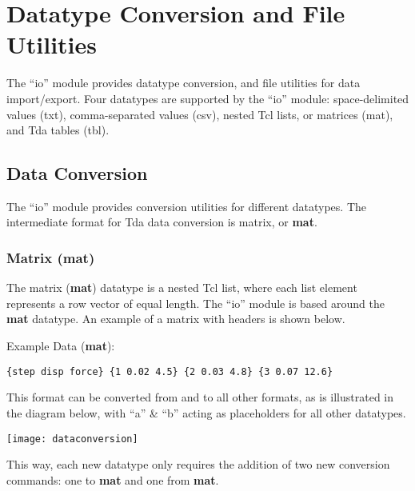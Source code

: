 \cleartooddpage[\thispagestyle{empty}]
\chapter{Datatype Conversion and File Utilities}\label{io}
The ``io'' module provides datatype conversion, and file utilities for data import/export.
Four datatypes are supported by the ``io'' module: space-delimited values (txt), comma-separated values (csv), nested Tcl lists, or matrices (mat), and Tda tables (tbl). 
\clearpage

\section{Data Conversion}
The ``io'' module provides conversion utilities for different datatypes.  The intermediate format for Tda data conversion is matrix, or \textbf{mat}. 
\subsection{Matrix (mat)}
The matrix (\textbf{mat}) datatype is a nested Tcl list, where each list element represents a row vector of equal length. The ``io'' module is based around the \textbf{mat} datatype. An example of a matrix with headers is shown below. 
\begin{example}{Example Data (\textbf{mat}):}
\begin{lstlisting}
{step disp force} {1 0.02 4.5} {2 0.03 4.8} {3 0.07 12.6}
\end{lstlisting}
\end{example}
This format can be converted from and to all other formats, as is illustrated in the diagram below, with ``a'' \& ``b'' acting as placeholders for all other datatypes.
\begin{center}
\texttt{[image: dataconversion]}
\end{center}
This way, each new datatype only requires the addition of two new conversion commands: one to \textbf{mat} and one from \textbf{mat}.
\clearpage
